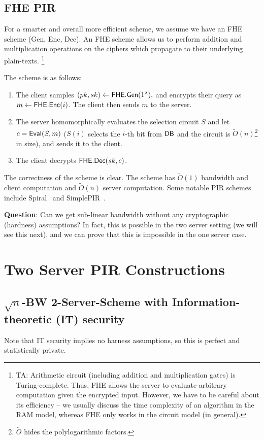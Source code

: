 \subsection{FHE PIR}
For a smarter and overall more efficient scheme, we assume we have an FHE scheme (Gen, Enc, Dec). An FHE scheme allows us to perform addition and multiplication operations on the ciphers which propagate to their underlying plain-texts.
\footnote{TA:
Arithmetic circuit (including addition and multiplication gates) is Turing-complete. Thus, FHE allows the server to evaluate arbitrary computation given the encrypted input. However, we have to be careful about its efficiency -- we usually discuss the time complexity of an algorithm in the RAM model, whereas FHE only works in the circuit model (in general).}

The scheme is as follows:
\begin{enumerate}
	\item The client samples $(pk,sk) \leftarrow {\sf FHE}.{\sf Gen}(1^\lambda),$ and encrypts their query as $m \leftarrow {\sf FHE}.{\sf Enc}(i)$. The client then sends $m$ to the server.
	\item The server homomorphically evaluates the selection circuit $S$ and let ${c} = {\sf Eval}(S, m)$ ($S(i)$ selects the $i$-th bit from ${\sf DB}$ and the circuit is $\tilde{O}(n)$\footnote{$\tilde{O}$ hides the polylogarithmic factors.} in size), and sends it to the client. 
	\item The client decrypts ${\sf FHE}.{\sf Dec}(sk,c)$.
\end{enumerate}
The correctness of the scheme is clear. The scheme  has $\tilde{O}(1)$ bandwidth and client computation and $\tilde{O}(n)$ server computation. Some notable PIR schemes include Spiral~\cite{spiral} and SimplePIR~\cite{simplepir}.

\textbf{Question}: Can we get sub-linear bandwidth without any cryptographic (hardness) assumptions? In fact, this is possible in the two server setting (we will see this next), and we can prove that this is impossible in the one server case.

\section{Two Server PIR Constructions}
\subsection{$\sqrt{n}$-BW 2-Server-Scheme with Information-theoretic (IT) security}
Note that IT security implies no harness assumptions, so this is perfect and statistically private.

